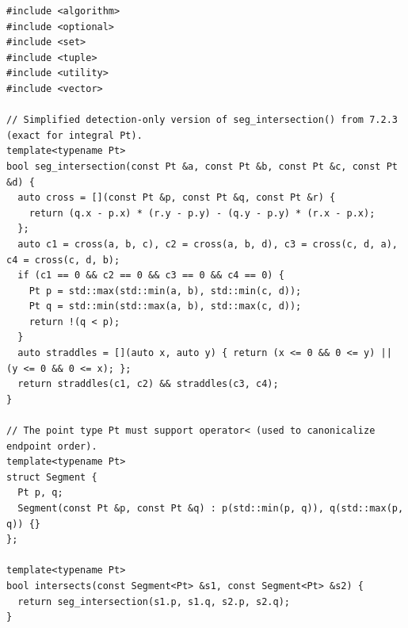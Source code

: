 \begin{lstlisting}[style=cpp]
#include <algorithm>
#include <optional>
#include <set>
#include <tuple>
#include <utility>
#include <vector>

// Simplified detection-only version of seg_intersection() from 7.2.3 (exact for integral Pt).
template<typename Pt>
bool seg_intersection(const Pt &a, const Pt &b, const Pt &c, const Pt &d) {
  auto cross = [](const Pt &p, const Pt &q, const Pt &r) {
    return (q.x - p.x) * (r.y - p.y) - (q.y - p.y) * (r.x - p.x);
  };
  auto c1 = cross(a, b, c), c2 = cross(a, b, d), c3 = cross(c, d, a), c4 = cross(c, d, b);
  if (c1 == 0 && c2 == 0 && c3 == 0 && c4 == 0) {
    Pt p = std::max(std::min(a, b), std::min(c, d));
    Pt q = std::min(std::max(a, b), std::max(c, d));
    return !(q < p);
  }
  auto straddles = [](auto x, auto y) { return (x <= 0 && 0 <= y) || (y <= 0 && 0 <= x); };
  return straddles(c1, c2) && straddles(c3, c4);
}

// The point type Pt must support operator< (used to canonicalize endpoint order).
template<typename Pt>
struct Segment {
  Pt p, q;
  Segment(const Pt &p, const Pt &q) : p(std::min(p, q)), q(std::max(p, q)) {}
};

template<typename Pt>
bool intersects(const Segment<Pt> &s1, const Segment<Pt> &s2) {
  return seg_intersection(s1.p, s1.q, s2.p, s2.q);
}


\end{lstlisting}
